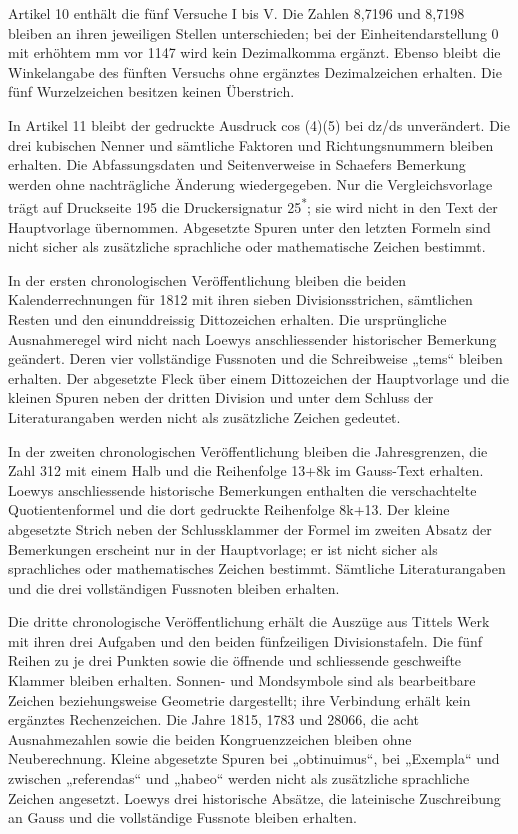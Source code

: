 Artikel 10 enthält die fünf Versuche I bis V. Die Zahlen 8,7196 und 8,7198 bleiben an ihren jeweiligen Stellen unterschieden; bei der Einheitendarstellung 0 mit erhöhtem mm vor 1147 wird kein Dezimalkomma ergänzt. Ebenso bleibt die Winkelangabe des fünften Versuchs ohne ergänztes Dezimalzeichen erhalten. Die fünf Wurzelzeichen besitzen keinen Überstrich.

In Artikel 11 bleibt der gedruckte Ausdruck cos (4)(5) bei dz/ds unverändert. Die drei kubischen Nenner und sämtliche Faktoren und Richtungsnummern bleiben erhalten. Die Abfassungsdaten und Seitenverweise in Schaefers Bemerkung werden ohne nachträgliche Änderung wiedergegeben. Nur die Vergleichsvorlage trägt auf Druckseite 195 die Druckersignatur 25\textsuperscript{*}; sie wird nicht in den Text der Hauptvorlage übernommen. Abgesetzte Spuren unter den letzten Formeln sind nicht sicher als zusätzliche sprachliche oder mathematische Zeichen bestimmt.

In der ersten chronologischen Veröffentlichung bleiben die beiden Kalenderrechnungen für 1812 mit ihren sieben Divisionsstrichen, sämtlichen Resten und den einunddreissig Dittozeichen erhalten. Die ursprüngliche Ausnahmeregel wird nicht nach Loewys anschliessender historischer Bemerkung geändert. Deren vier vollständige Fussnoten und die Schreibweise „tems“ bleiben erhalten. Der abgesetzte Fleck über einem Dittozeichen der Hauptvorlage und die kleinen Spuren neben der dritten Division und unter dem Schluss der Literaturangaben werden nicht als zusätzliche Zeichen gedeutet.

In der zweiten chronologischen Veröffentlichung bleiben die Jahresgrenzen, die Zahl 312 mit einem Halb und die Reihenfolge 13+8k im Gauss-Text erhalten. Loewys anschliessende historische Bemerkungen enthalten die verschachtelte Quotientenformel und die dort gedruckte Reihenfolge 8k+13. Der kleine abgesetzte Strich neben der Schlussklammer der Formel im zweiten Absatz der Bemerkungen erscheint nur in der Hauptvorlage; er ist nicht sicher als sprachliches oder mathematisches Zeichen bestimmt. Sämtliche Literaturangaben und die drei vollständigen Fussnoten bleiben erhalten.

Die dritte chronologische Veröffentlichung erhält die Auszüge aus Tittels Werk mit ihren drei Aufgaben und den beiden fünfzeiligen Divisionstafeln. Die fünf Reihen zu je drei Punkten sowie die öffnende und schliessende geschweifte Klammer bleiben erhalten. Sonnen- und Mondsymbole sind als bearbeitbare Zeichen beziehungsweise Geometrie dargestellt; ihre Verbindung erhält kein ergänztes Rechenzeichen. Die Jahre 1815, 1783 und 28066, die acht Ausnahmezahlen sowie die beiden Kongruenzzeichen bleiben ohne Neuberechnung. Kleine abgesetzte Spuren bei „obtinuimus“, bei „Exempla“ und zwischen „referendas“ und „habeo“ werden nicht als zusätzliche sprachliche Zeichen angesetzt. Loewys drei historische Absätze, die lateinische Zuschreibung an Gauss und die vollständige Fussnote bleiben erhalten.

